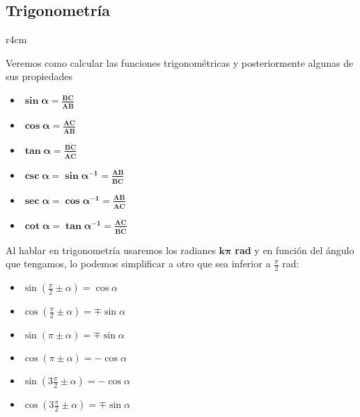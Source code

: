 \subsection{Trigonometría}
\begin{wrapfigure}{r}{4cm}
        \vspace{1cm}
        \hspace{-4cm}
\end{wrapfigure}
 Veremos como calcular las funciones trigonométricas y posteriormente algunas de sus propiedades
\begin{itemize}
        \item \(\bm{\sin{\bm{\alpha}} = \frac{\overline{BC}}{\overline{AB}}}\)
        \item \(\bm{\cos{\bm{\alpha}} = \frac{\overline{AC}}{\overline{AB}}}\)
        \item \(\bm{\tan{\bm{\alpha}} = \frac{\overline{BC}}{\overline{AC}}}\)
        \item \(\bm{\csc{\bm{\alpha}} = \sin{\bm{\alpha}}^{-1}=\frac{\overline{AB}}{\overline{BC}}}\)
        \item \(\bm{\sec{\bm{\alpha}} = \cos{\bm{\alpha}}^{-1}=\frac{\overline{AB}}{\overline{AC}}}\)
        \item \(\bm{\cot{\bm{\alpha}} = \tan{\bm{\alpha}}^{-1}=\frac{\overline{AC}}{\overline{BC}}}\)
\end{itemize}
Al hablar en trigonometría usaremos los radianes \(\bm{k\pi}\) \textbf{rad} y en función del ángulo que tengamos, lo podemos simplificar a otro que sea inferior a \(\frac{\pi}{2}\) rad:
\begin{itemize}
        \item {\boldmath \(\sin{(\frac{\pi}{2} \pm \alpha)} = \cos{\alpha}\)}
        \item {\boldmath \(\cos{(\frac{\pi}{2} \pm \alpha)} = \mp\sin{\alpha}\)}
        \item {\boldmath \(\sin{(\pi \pm \alpha)} = \mp\sin{\alpha}\)}
        \item {\boldmath \(\cos{(\pi \pm \alpha)} = -\cos{\alpha}\)}
        \item {\boldmath \(\sin{(3\frac{\pi}{2} \pm \alpha)} = -\cos{\alpha}\)}
        \item {\boldmath \(\cos{(3\frac{\pi}{2} \pm \alpha)} = \mp\sin{\alpha}\)}
\end{itemize}
